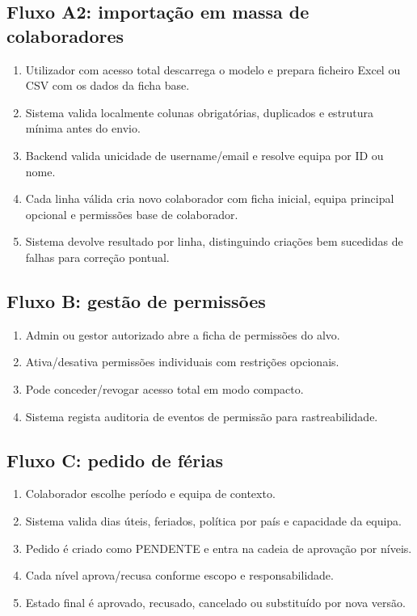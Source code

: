 \documentclass[11pt,a4paper]{article}
\begin{document}
\subsection{Fluxo A2: importação em massa de colaboradores}
\begin{enumerate}
  \item Utilizador com acesso total descarrega o modelo e prepara ficheiro Excel ou CSV com os dados da ficha base.
  \item Sistema valida localmente colunas obrigatórias, duplicados e estrutura mínima antes do envio.
  \item Backend valida unicidade de username/email e resolve equipa por ID ou nome.
  \item Cada linha válida cria novo colaborador com ficha inicial, equipa principal opcional e permissões base de colaborador.
  \item Sistema devolve resultado por linha, distinguindo criações bem sucedidas de falhas para correção pontual.
\end{enumerate}

\subsection{Fluxo B: gestão de permissões}
\begin{enumerate}
  \item Admin ou gestor autorizado abre a ficha de permissões do alvo.
  \item Ativa/desativa permissões individuais com restrições opcionais.
  \item Pode conceder/revogar acesso total em modo compacto.
  \item Sistema regista auditoria de eventos de permissão para rastreabilidade.
\end{enumerate}

\subsection{Fluxo C: pedido de férias}
\begin{enumerate}
  \item Colaborador escolhe período e equipa de contexto.
  \item Sistema valida dias úteis, feriados, política por país e capacidade da equipa.
  \item Pedido é criado como PENDENTE e entra na cadeia de aprovação por níveis.
  \item Cada nível aprova/recusa conforme escopo e responsabilidade.
  \item Estado final é aprovado, recusado, cancelado ou substituído por nova versão.
\end{enumerate}
\end{document}
